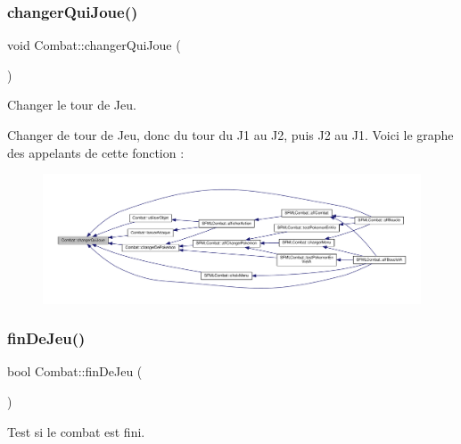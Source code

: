 \subsubsection{\texorpdfstring{changer\+Qui\+Joue()}{changerQuiJoue()}}
{\footnotesize\ttfamily void Combat\+::changer\+Qui\+Joue (\begin{DoxyParamCaption}{ }\end{DoxyParamCaption})}



Changer le tour de Jeu. 

Changer de tour de Jeu, donc du tour du J1 au J2, puis J2 au J1. Voici le graphe des appelants de cette fonction \+:\nopagebreak
\begin{figure}[H]
\begin{center}
\leavevmode
\includegraphics[width=350pt]{class_combat_a2848c91d76a09943dd5effb1904f1937_icgraph}
\end{center}
\end{figure}
\mbox{\label{class_combat_abbaadce2f31d9b12645481cc74a021b2}} 
\subsubsection{\texorpdfstring{fin\+De\+Jeu()}{finDeJeu()}}
{\footnotesize\ttfamily bool Combat\+::fin\+De\+Jeu (\begin{DoxyParamCaption}{ }\end{DoxyParamCaption})}



Test si le combat est fini. 


